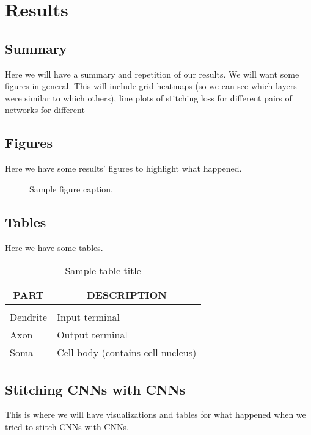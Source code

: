 \documentclass{article} %
\begin{document}
\section{Results}
\subsection{Summary}
Here we will have a summary and repetition of our results. We will want some figures in general. This will
include grid heatmaps (so we can see which layers were similar to which others), line plots of stitching loss
for different pairs of networks for different 

\subsection{Figures}
Here we have some results' figures to highlight what happened.

\begin{figure}[h]
\begin{center}
\fbox{\rule[-.5cm]{0cm}{4cm} \rule[-.5cm]{4cm}{0cm}}
\end{center}
\caption{Sample figure caption.}
\end{figure}

\subsection{Tables}
Here we have some tables.

\begin{table}[h]
\caption{Sample table title}
\label{sample-table}
\begin{center}
\begin{tabular}{ll}
\multicolumn{1}{c}{\bf PART}  &\multicolumn{1}{c}{\bf DESCRIPTION}
\\ \hline \\
Dendrite         &Input terminal \\
Axon             &Output terminal \\
Soma             &Cell body (contains cell nucleus) \\
\end{tabular}
\end{center}
\end{table}

\subsection{Stitching CNNs with CNNs}
This is where we will have visualizations and tables for what happened when
we tried to stitch CNNs with CNNs.
\end{document}
